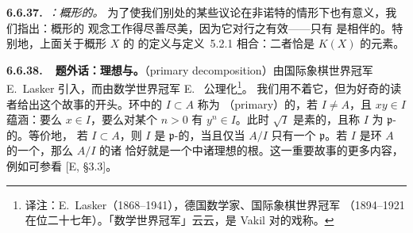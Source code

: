 \textbf{6.6.37.}\ \emph{\trhRemark{}：\trIntegral{}概形的\trAssociatedPoint。}\quad
为了使我们别处的某些议论在非诺特的情形下也有意义，我们指出：\trIntegral{}概形的%
\trAssociatedPoint{}观念工作得尽善尽美，因为它对\trIntegralDomain{}行之有效——只有%
\trGenericPoint{}是相伴的。特别地，上面关于\trIntegral{}概形 $X$ 的\trRationalFunction{}%
的定义与定义~5.2.1 相合：二者恰是\trFunctionField{} $K(X)$ 的元素。

\textbf{6.6.38.\ \extrahard{}\ 题外话：\trPrimary{}理想与\trAssociatedPrimeIdeal{}。}\quad \trPrimaryDecomposition{}（primary
decomposition）由国际象棋世界冠军 E.~Lasker 引入，而由数学世界冠军 E.~\trNoether{}%
公理化\footnote{译注：E.~Lasker（1868--1941），德国数学家、国际象棋世界冠军
（1894--1921 在位二十七年）。「数学世界冠军」云云，是 Vakil 对\trNoether{}的戏称。}。
我们用不着它，但为好奇的读者给出这个故事的开头。环中的\trIdeal{} $I\subset A$ 称为%
\textbf{\trPrimary{}}（primary）的，若 $I\neq A$，且 $xy\in I$ 蕴涵：要么 $x\in I$，要么对某个
$n>0$ 有 $y^n\in I$。此时 $\sqrt{I}$ 是素的，且称 $I$ 为 $\mathfrak{p}$-\trPrimary{}的。等价地，
若 $I\subset A$，则 $I$ 是 $\mathfrak{p}$-\trPrimary{}的，当且仅当 $A/I$ 只有一个\trAssociatedPrimeIdeal{}
$\mathfrak{p}$。若 $I$ 是\trNoetherian{}环 $A$ 的一个\trIdeal，那么 $A/I$ 的诸\trAssociatedPrimeIdeal{}
恰好就是一个\trPrimaryDecomposition{}中诸理想的根。这一重要故事的更多内容，例如可参看 [E, \S3.3]。
